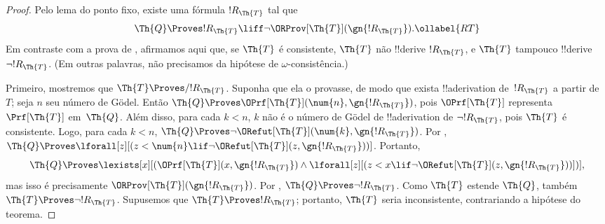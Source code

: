 \documentclass[../../../include/open-logic-section]{subfiles}
\begin{document}
\begin{proof}
Pelo lema do ponto fixo, existe uma fórmula $!R_\Th{T}$ tal que
\begin{equation}
  \Th{Q} \Proves !R_\Th{T} \liff \lnot \ORProv[\Th{T}](\gn{!R_\Th{T}}).
  \ollabel{RT}
\end{equation}
Em contraste com a prova de , afirmamos
aqui que, se $\Th{T}$ é consistente, $\Th{T}$ não !!{derive}
$!R_\Th{T}$, e $\Th{T}$ tampouco !!{derive} $\lnot !R_\Th{T}$. (Em outras palavras,
não precisamos da hipótese de $\omega$-consistência.)

Primeiro, mostremos que $\Th{T} \Proves/ !R_{\Th{T}}$. Suponha que ela o
provasse, de modo que exista !!a{derivation} de~$!R_{\Th{T}}$ a partir
de~$T$; seja $n$ seu número de G\"odel. Então
$\Th{Q} \Proves \OPrf[\Th{T}](\num{n}, \gn{!R_{\Th{T}}})$, pois
$\OPrf[\Th{T}]$ representa $\Prf[\Th{T}]$ em~$\Th{Q}$. Além disso, para
cada $k < n$, $k$ não é o número de G\"odel de !!a{derivation} de
$\lnot !R_{\Th{T}}$, pois $\Th{T}$ é consistente. Logo, para cada $k < n$,
$\Th{Q} \Proves \lnot
\ORefut[\Th{T}](\num{k}, \gn{!R_{\Th{T}}})$. Por
,
$\Th{Q} \Proves \lforall[z][(z < \num{n} \lif \lnot \ORefut[\Th{T}](z,
  \gn{!R_{\Th{T}}}))]$. Portanto,
\[
\Th{Q} \Proves \lexists[x][(\OPrf[\Th{T}](x,\gn{!R_{\Th{T}}}) \land \lforall[z][(z
    < x \lif \lnot \ORefut[\Th{T}](z,\gn{!R_{\Th{T}}}))])],
\]
mas isso é precisamente $\ORProv[\Th{T}](\gn{!R_{\Th{T}}})$. Por
, $\Th{Q} \Proves \lnot !R_{\Th{T}}$. Como $\Th{T}$ estende
$\Th{Q}$, também $\Th{T} \Proves \lnot !R_{\Th{T}}$. Supusemos que
$\Th{T} \Proves !R_{\Th{T}}$; portanto, $\Th{T}$ seria inconsistente,
contrariando a hipótese do teorema.


\end{proof}
\end{document}
